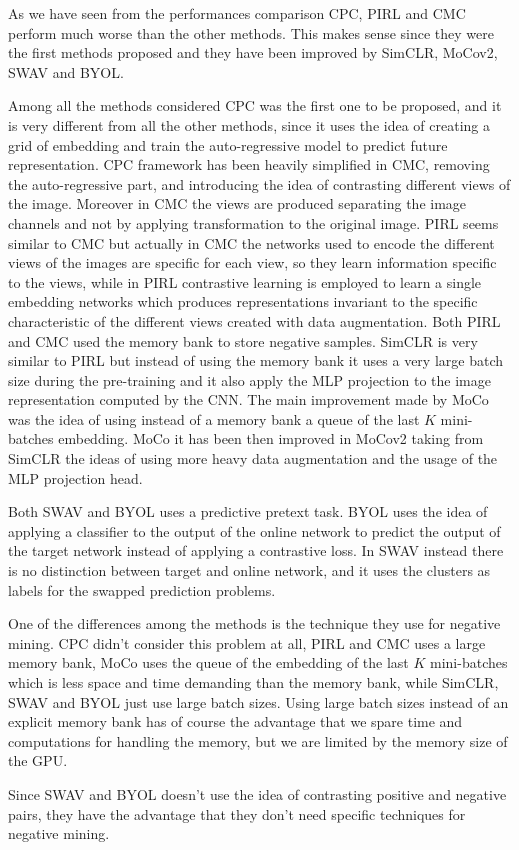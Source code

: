 As we have seen from the performances comparison CPC, PIRL and CMC perform much worse than the other methods. This makes sense since they were the first methods proposed and they have been improved by SimCLR, MoCov2, SWAV and BYOL. 

Among all the methods considered CPC was the first one to be proposed, and it is very different from all the other methods, since it uses the idea of creating a grid of embedding and train the auto-regressive model to predict future representation. CPC framework has been heavily simplified in CMC, removing the auto-regressive part, and introducing the idea of contrasting different views of the image. Moreover in CMC the views are produced separating the image channels and not by applying transformation to the original image. PIRL seems similar to CMC but actually in CMC the networks used to encode the different views of the images are specific for each view, so they learn information specific to the views, while in PIRL contrastive learning is employed to learn a single embedding networks which produces representations invariant to the specific characteristic of the different views created with data augmentation. Both PIRL and CMC used the memory bank to store negative samples. SimCLR is very similar to PIRL but instead of using the memory bank it uses a very large batch size during the pre-training and it also apply the MLP projection to the image representation computed by the CNN. The main improvement made by MoCo was the idea of using instead of a memory bank a queue of the last $K$ mini-batches embedding. MoCo it has been then improved in MoCov2 taking from SimCLR the ideas of using more heavy data augmentation and the usage of the MLP projection head.

Both SWAV and BYOL uses a predictive pretext task. BYOL uses the idea of applying a classifier to the output of the online network to predict the output of the target network instead of applying a contrastive loss. In SWAV instead there is no distinction between target and online network, and it uses the clusters as labels for the swapped prediction problems.

One of the differences among the methods is the technique they use for negative mining. CPC didn't consider this problem at all, PIRL and CMC uses a large memory bank, MoCo uses the queue of the embedding of the last $K$ mini-batches which is less space and time demanding than the memory bank, while SimCLR, SWAV and BYOL just use large batch sizes. Using large batch sizes instead of an explicit memory bank has of course the advantage that we spare time and computations for handling the memory, but we are limited by the memory size of the GPU.

Since SWAV and BYOL doesn't use the idea of contrasting positive and negative pairs, they have the advantage that they don't need specific techniques for negative mining.